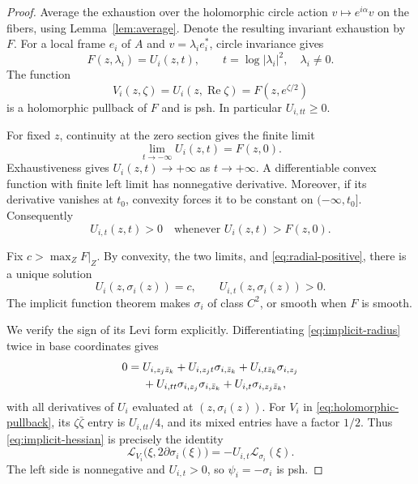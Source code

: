 \documentclass[11pt]{amsart}
\theoremstyle{definition}
\theoremstyle{remark}
\numberwithin{equation}{section}
\newcommand{\Levi}{\mathcal L}
\begin{document}
\begin{proof}
Average the exhaustion over the holomorphic circle action
$v\mapsto e^{i\alpha}v$ on the fibers, using
Lemma~\ref{lem:average}. Denote the resulting invariant exhaustion by
$F$. For a local frame $e_i$ of $A$ and $v=\lambda_i e_i^*$, circle
invariance gives
\begin{equation}\label{eq:radial-function}
 F(z,\lambda_i)=U_i(z,t),\qquad t=\log|\lambda_i|^2,
 \quad\lambda_i\ne0.
\end{equation}
The function
\begin{equation}\label{eq:holomorphic-pullback}
 V_i(z,\zeta)=U_i(z,\operatorname{Re}\zeta)
             =F(z,e^{\zeta/2})
\end{equation}
is a holomorphic pullback of $F$ and is psh. In particular
$U_{i,tt}\ge0$.

For fixed $z$, continuity at the zero section gives the finite limit
\[
 \lim_{t\to-\infty}U_i(z,t)=F(z,0).
\]
Exhaustiveness gives $U_i(z,t)\to+\infty$ as $t\to+\infty$.
A differentiable convex function with finite left limit has
nonnegative derivative. Moreover, if its derivative vanishes at
$t_0$, convexity forces it to be constant on $(-\infty,t_0]$.
Consequently
\begin{equation}\label{eq:radial-positive}
 U_{i,t}(z,t)>0\quad\text{whenever }U_i(z,t)>F(z,0).
\end{equation}

Fix $c>\max_ZF|_Z$. By convexity, the two limits, and
\eqref{eq:radial-positive}, there is a unique solution
\begin{equation}\label{eq:implicit-radius}
 U_i(z,\sigma_i(z))=c,
 \qquad U_{i,t}(z,\sigma_i(z))>0.
\end{equation}
The implicit function theorem makes $\sigma_i$ of class $C^2$, or
smooth when $F$ is smooth.

We verify the sign of its Levi form explicitly. Differentiating
\eqref{eq:implicit-radius} twice in base coordinates gives
\begin{align}\label{eq:implicit-hessian}
 0={}&U_{i,z_j\bar z_k}
 +U_{i,z_jt}\sigma_{i,\bar z_k}
 +U_{i,t\bar z_k}\sigma_{i,z_j}\notag\\
 &+U_{i,tt}\sigma_{i,z_j}\sigma_{i,\bar z_k}
 +U_{i,t}\sigma_{i,z_j\bar z_k},
\end{align}
with all derivatives of $U_i$ evaluated at $(z,\sigma_i(z))$.
For $V_i$ in \eqref{eq:holomorphic-pullback}, its $\zeta\bar\zeta$
entry is $U_{i,tt}/4$, and its mixed entries have a factor $1/2$.
Thus \eqref{eq:implicit-hessian} is precisely the identity
\begin{equation}\label{eq:radius-Levi}
 \Levi_{V_i}\bigl(\xi,2\partial\sigma_i(\xi)\bigr)
 =-U_{i,t}\Levi_{\sigma_i}(\xi).
\end{equation}
The left side is nonnegative and $U_{i,t}>0$, so
$\psi_i=-\sigma_i$ is psh.


\end{proof}
\end{document}
